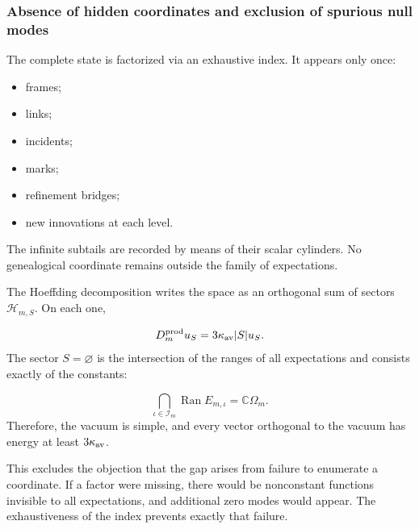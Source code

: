 \subsubsection{Absence of hidden coordinates and exclusion of spurious null modes}
The complete state is factorized via an exhaustive index. It appears only once:\par
\begin{itemize}
\item frames;
\item links;
\item incidents;
\item marks;
\item refinement bridges;
\item new innovations at each level.
\end{itemize}
The infinite subtails are recorded by means of their scalar cylinders. No genealogical coordinate remains outside the family of expectations.\par
The Hoeffding decomposition writes the space as an orthogonal sum of sectors \(\mathcal H_{m,S}\). On each one,\par
\[
D_m^{\rm prod}u_S
=
3\kappa_{\rm av}|S|u_S.
\]
The sector \(S=\varnothing\) is the intersection of the ranges of all expectations and consists exactly of the constants:\par
\[
\bigcap_{\iota\in\mathcal I_m}
\operatorname{Ran}E_{m,\iota}
=
\mathbb C\Omega_m.
\]
Therefore, the vacuum is simple, and every vector orthogonal to the vacuum has energy at least \(3\kappa_{\rm av}\).\par
This excludes the objection that the gap arises from failure to enumerate a coordinate. If a factor were missing, there would be nonconstant functions invisible to all expectations, and additional zero modes would appear. The exhaustiveness of the index prevents exactly that failure.\par
{}
